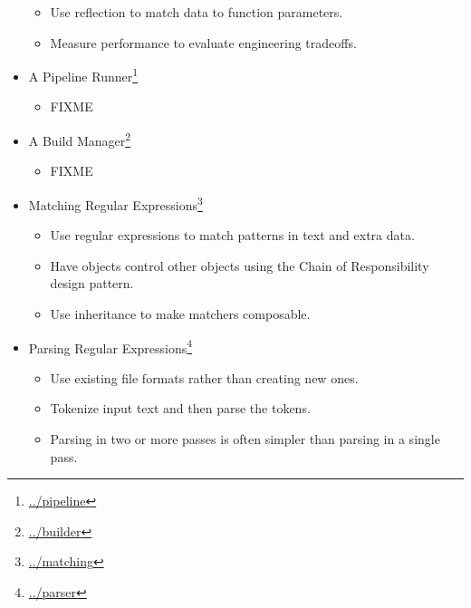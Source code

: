 \documentclass{scrbook}
\newcommand{\hreffoot}[2]{{#1}\footnote{\href{#2}{#2}}}
\begin{document}
\begin{itemize}
\begin{itemize}
\item Use reflection to match data to function parameters.

\item Measure performance to evaluate engineering tradeoffs.

\end{itemize}



\item \hreffoot{A Pipeline Runner}{../pipeline}
\begin{itemize}

\item FIXME

\end{itemize}



\item \hreffoot{A Build Manager}{../builder}
\begin{itemize}

\item FIXME

\end{itemize}



\item \hreffoot{Matching Regular Expressions}{../matching}
\begin{itemize}

\item Use regular expressions to match patterns in text and extra data.

\item Have objects control other objects using the Chain of Responsibility design pattern.

\item Use inheritance to make matchers composable.

\end{itemize}



\item \hreffoot{Parsing Regular Expressions}{../parser}
\begin{itemize}

\item Use existing file formats rather than creating new ones.

\item Tokenize input text and then parse the tokens.

\item Parsing in two or more passes is often simpler than parsing in a single pass.


\end{itemize}
\end{itemize}
\end{document}
